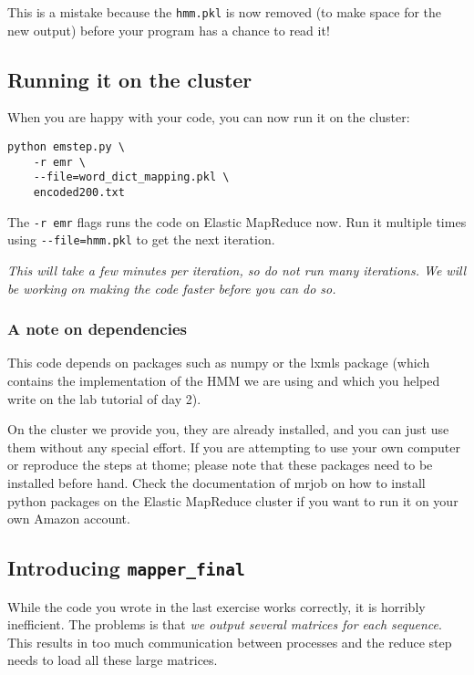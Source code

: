 This is a mistake because the \verb+hmm.pkl+ is now removed (to make space for
the new output) before your program has a chance to read it!

\subsection{Running it on the cluster}

When you are happy with your code, you can now run it on the cluster:

\begin{verbatim}
python emstep.py \
    -r emr \
    --file=word_dict_mapping.pkl \
    encoded200.txt
\end{verbatim}

The \verb+-r emr+ flags runs the code on Elastic MapReduce now. Run it multiple
times using \verb+--file=hmm.pkl+ to get the next iteration.

\emph{This will take a few minutes per iteration, so do not run many
iterations. We will be working on making the code faster before you can do
so.}

\subsubsection{A note on dependencies}

This code depends on packages such as numpy or the lxmls package (which
contains the implementation of the HMM we are using and which you helped write
on the lab tutorial of day 2).

On the cluster we provide you, they are already installed, and you can just use
them without any special effort. If you are attempting to use your own computer
or reproduce the steps at thome; please note that these packages need to be
installed before hand. Check the documentation of mrjob on how to install
python packages on the Elastic MapReduce cluster if you want to run it on your
own Amazon account.

\subsection{Introducing \texttt{mapper\_final}}

While the code you wrote in the last exercise works correctly, it is horribly
inefficient. The problems is that \emph{we output several matrices for each
sequence}. This results in too much communication between processes and the
reduce step needs to load all these large matrices.

